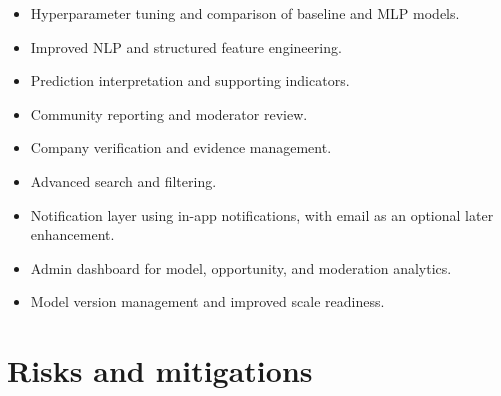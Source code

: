 \documentclass[11pt,a4paper]{article}
\begin{document}
\begin{itemize}[leftmargin=0.7cm]

    \item Hyperparameter tuning and comparison of baseline and MLP models.

    \item Improved NLP and structured feature engineering.

    \item Prediction interpretation and supporting indicators.

    \item Community reporting and moderator review.

    \item Company verification and evidence management.

    \item Advanced search and filtering.

    \item Notification layer using in-app notifications, with email as an
    optional later enhancement.

    \item Admin dashboard for model, opportunity, and moderation analytics.

    \item Model version management and improved scale readiness.
\end{itemize}

\section{Risks and mitigations}
\end{document}
